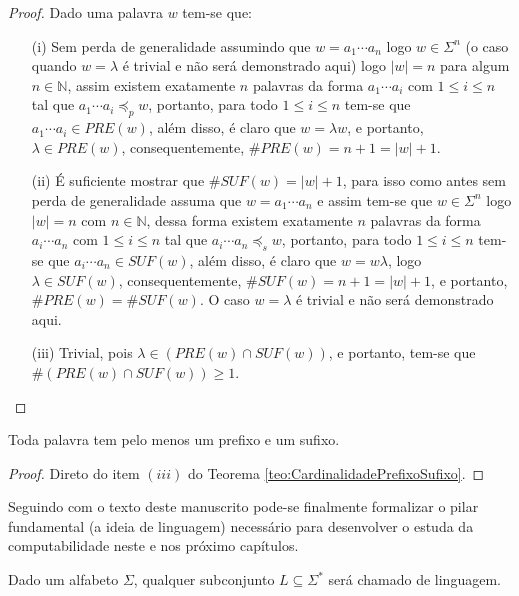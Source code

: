 \begin{proof}
	Dado uma palavra $w$ tem-se que:
	\begin{itemize}
		\item[(i)] Sem perda de generalidade assumindo que $w = a_1\cdots a_n$ logo $w \in \Sigma^n$ (o caso quando $w = \lambda$ é trivial e não será demonstrado aqui) logo $|w| = n$ para algum $n \in \mathbb{N}$, assim existem exatamente $n$ palavras da forma $a_1 \cdots a_i$ com $1 \leq i \leq n$ tal que $a_1 \cdots a_i \preceq_p w$, portanto, para todo $1 \leq i \leq n$ tem-se que $a_1 \cdots a_i \in PRE(w)$, além disso, é claro que $w = \lambda w$, e portanto, $\lambda \in PRE(w)$, consequentemente, $\#PRE(w) = n + 1 = |w| + 1$.
		\item[(ii)] É suficiente mostrar que $\# SUF(w) = |w| + 1$, para isso como antes sem perda de generalidade assuma que $w = a_1\cdots a_n$ e assim tem-se que $w \in \Sigma^n$ logo $|w| = n$ com $n \in \mathbb{N}$, dessa forma existem exatamente $n$ palavras da forma $a_i \cdots a_n$ com $1 \leq i \leq n$ tal que $a_i \cdots a_n \preceq_s w$, portanto, para todo $1 \leq i \leq n$ tem-se que $a_i \cdots a_n \in SUF(w)$, além disso, é claro que $w = w\lambda$, logo $\lambda \in SUF(w)$, consequentemente, $\#SUF(w) = n + 1 = |w| + 1$, e portanto, $\#PRE(w) = \#SUF(w)$. O caso $w = \lambda$ é trivial e não será demonstrado aqui.
		\item[(iii)] Trivial, pois $\lambda \in (PRE(w) \cap SUF(w))$, e portanto, tem-se que $\#(PRE(w) \cap SUF(w)) \geq 1$.
	\end{itemize}
\end{proof}

\begin{corollary}
	Toda palavra tem pelo menos um prefixo e um sufixo.
\end{corollary}

\begin{proof}
	Direto do item $(iii)$ do Teorema \ref{teo:CardinalidadePrefixoSufixo}.
\end{proof}

Seguindo com o texto deste manuscrito pode-se finalmente formalizar o pilar fundamental (a ideia de linguagem) necessário para desenvolver o estuda da computabilidade neste e nos próximo capítulos.

\begin{definition}[Linguagem]\label{def:Linguagem}
	Dado um alfabeto $\Sigma$, qualquer subconjunto $L \subseteq \Sigma^*$ será chamado de linguagem.
\end{definition}

